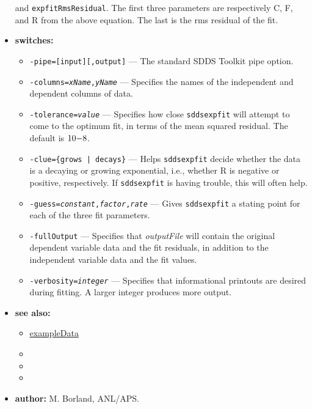 \begin{itemize}
and {\tt expfitRmsResidual}.  The first three parameters are respectively C, F, and R from the above
equation.  The last is the rms residual of the fit.
\item {\bf switches:}
    \begin{itemize}
    \item {\tt -pipe=[input][,output]} --- The standard SDDS Toolkit pipe option.
    \item {\tt -columns={\em xName},{\em yName}} --- Specifies the names of the independent and dependent columns of data.
    \item {\tt -tolerance={\em value}} --- Specifies how close {\tt sddsexpfit} will attempt to come to the optimum fit,
        in terms of the mean squared residual.  The default is ${\rm 10 {-8}}$.
    \item {\tt -clue=\{grows | decays\}} --- Helps {\tt sddsexpfit} decide whether the data is a decaying or growing exponential,
        i.e., whether R is negative or positive, respectively.  If {\tt sddsexpfit} is having trouble, this
        will often help.
    \item {\tt -guess={\em constant},{\em factor},{\em rate}} --- Gives {\tt sddsexpfit} a stating point for each of the three fit parameters.
    \item {\tt -fullOutput} --- Specifies that {\em outputFile} will contain the original dependent variable
        data and the fit residuals, in addition to the independent variable data and the fit values.
    \item {\tt -verbosity={\em integer}} --- Specifies that informational printouts are desired during fitting.  A larger
        integer produces more output.
    \end{itemize}
\item {\bf see also:}
    \begin{itemize}
    \item \hyperref{Data for Examples}{Data for Examples (see }{)}{exampleData}
    \item {}
    \item {}
    \item {}
    \end{itemize}
\item {\bf author:} M. Borland, ANL/APS.
\end{itemize}


